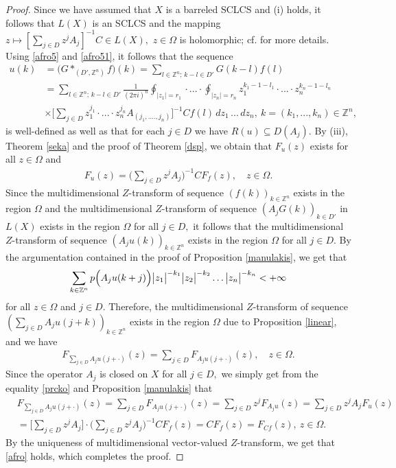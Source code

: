 \documentclass{amsart}
\theoremstyle{definition}
\theoremstyle{remark}
\numberwithin{equation}{section}
\begin{document}
\begin{proof} 
Since we have assumed that $X$ is a barreled SCLCS and (i) holds, it follows that $L(X)$ is an SCLCS and the mapping $z\mapsto [\sum_{j\in D}z^{j}A_{j}]^{-1}C\in L(X),$ $z\in \Omega$ is holomorphic; cf. \cite{FKP} for more details.
Using \eqref{afro5} and \eqref{afro51}, it follows that the sequence
\begin{align*}
u(k)&= \bigl(G\ast_{(D',{\mathbb Z}^{n})} f\bigr)(k)=\sum_{l\in {\mathbb Z}^{n};\, k-l\in D'}G(k-l)f(l)
\\& =\sum_{l\in {\mathbb Z}^{n};\, k-l\in D'}\frac{1}{(2\pi i)^{n}}\oint_{|z_{1}|=r_{1}}\cdot ... \cdot \oint_{|z_{n}|=r_{n}}z_{1}^{k_{1}-1-l_{1}}\cdot ... \cdot z_{n}^{k_{n}-1-l_{n}} \\ & \times
\Biggl[\sum_{j\in D}z_{1}^{j_{1}}\cdot ... \cdot z_{n}^{j_{n}}A_{(j_{1},....,j_{n})}\Biggr]^{-1}Cf(l)\, dz_{1}\, ...\, dz_{n} ,\ k=(k_{1},...,k_{n})\in {\mathbb Z}^{n},
\end{align*}
is well-defined as well as that for each $j\in D$ we have $R(u)\subseteq D(A_{j})$. By (iii), Theorem \ref{seka} and the proof of Theorem \ref{dsp}, we obtain that $F_{u}(z)$ exists for all $z\in \Omega$ and 
\begin{align}\label{prcko}
F_{u}(z)=\Biggl( \sum_{j\in D}z^{j}A_{j}\Biggr)^{-1}CF_{f}(z),\quad z\in \Omega.
\end{align}  
Since the multidimensional $Z$-transform of sequence $(f(k))_{k\in {\mathbb Z}^{n}}$ exists in the region $\Omega  $ and the multidimensional $Z$-transform of sequence $(A_{j}G(k))_{k\in D'}$ in $L(X)$ exists in the region $\Omega$ for all $j\in D,$ it follows that the multidimensional $Z$-transform of sequence $(A_{j}u(k))_{k\in {\mathbb Z}^{n}}$ exists in the region $\Omega  $ for all $j\in D.$ By the argumentation contained in the proof of Proposition \ref{manulakis}, we get that
$$
\sum_{k\in {\mathbb Z}^{n}}p\Bigl(A_{j}u(k+j) \Bigr)
\bigl|z_{1}\bigr|^{-k_{1}}\bigl|z_{2}\bigr|^{-k_{2}}\ldots \bigl| z_{n}\bigr|^{-k_{n}}<+\infty
$$
for all $z\in {\Omega}$ and $j\in D .$ Therefore, the multidimensional $Z$-transform of sequence $(\sum_{j\in D}A_{j}u(j+k))_{k\in {\mathbb Z}^{n}}$ exists in the region $\Omega $ due to Proposition \ref{linear}, and we have
\begin{align*} 
F_{\sum_{j\in D}A_{j}u(j+\cdot)}(z)=\sum_{j\in D}F_{A_{j}u(j+\cdot)}(z),\quad z\in \Omega.
\end{align*}
Since the operator $A_{j}$ is closed on $X$ for all $j\in D,$ we simply get from the equality \eqref{prcko} and Proposition \ref{manulakis} that
\begin{align*} & F_{\sum_{j\in D}A_{j}u(j+\cdot)}(z)=\sum_{j\in D}F_{A_{j}u(j+\cdot)}(z)=\sum_{j\in D}z^{j}F_{A_{j}u}(z)=\sum_{j\in D}z^{j}A_{j}F_{u}(z)
\\&=\Biggl[\sum_{j\in D}z^{j}A_{j}\Biggr] \cdot  \Biggl( \sum_{j\in D}z^{j}A_{j}\Biggr)^{-1}CF_{f}(z)=CF_{f}(z)=F_{Cf}(z),\ z\in \Omega.
\end{align*}
By the uniqueness of multidimensional vector-valued $Z$-transform, we get that \eqref{afro} holds, which completes the proof.
\end{proof}
\end{document}
